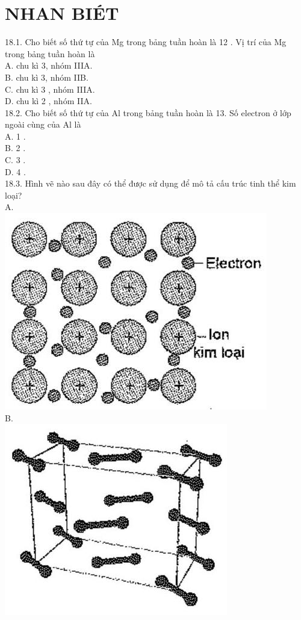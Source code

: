 \documentclass[10pt]{article}
\begin{document}
\section*{NHAN BIÉT}
18.1. Cho biết số thứ tự của Mg trong bảng tuần hoàn là 12 . Vị trí của Mg trong bảng tuần hoàn là\\
A. chu kì 3, nhóm IIIA.\\
B. chu kì 3, nhóm IIB.\\
C. chu kì 3 , nhóm IIIA.\\
D. chu kì 2 , nhóm IIA.\\
18.2. Cho biết số thứ tự của Al trong bảng tuần hoàn là 13. Số electron ở lớp ngoài cùng của Al là\\
A. 1 .\\
B. 2 .\\
C. 3 .\\
D. 4 .\\
18.3. Hình vẽ nào sau đây có thể được sử dụng để mô tả cấu trúc tinh thể kim loại?\\
A.\\
\includegraphics[max width=\textwidth, center]{2025_10_23_74efce88ce3a451fd6b0g-059(3)}\\
B.\\
\includegraphics[max width=\textwidth, center]{2025_10_23_74efce88ce3a451fd6b0g-059(2)}\\
\end{document}
